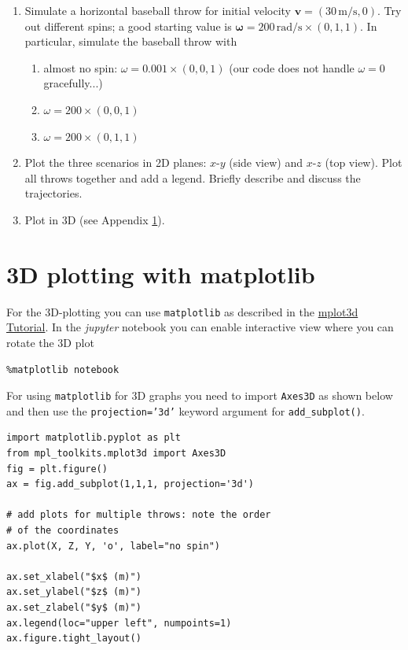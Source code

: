 \documentclass[letterpaper]{scrartcl}
\newenvironment{enuma}{\begin{enumerate}[label=(\alph*)]}{\end{enumerate}}
\newenvironment{enumi}{\begin{enumerate}[label=(\roman*)]}{\end{enumerate}}
\renewcommand{\vec}[1]{\ensuremath{\mathbf{#1}}}
\begin{document}
\begin{enuma}
\item Simulate a horizontal baseball throw for initial velocity
  $\vec{v} = (30\,\text{m/s}, 0)$.  Try out different spins; a good
  starting value is
  $\boldsymbol{\omega} = 200\,\text{rad/s} \times (0, 1, 1)$. In
  particular, simulate the baseball throw with
  \begin{enumi}
  \item almost no spin: $\omega = 0.001 \times (0, 0, 1)$ (our code
    does not handle $\omega = 0$ gracefully...)
  \item $\omega = 200 \times (0, 0, 1)$
  \item $\omega = 200 \times (0, 1, 1)$
  \end{enumi}
\item Plot the three scenarios in 2D planes: $x$-$y$ (side view) and
  $x$-$z$ (top view). Plot all throws together and add a
  legend. Briefly describe and discuss the trajectories.
\item Plot in 3D (see Appendix \ref{sec:mpl}).
\end{enuma}


\section{3D plotting with matplotlib}
\label{sec:mpl}

For the 3D-plotting you can use \texttt{matplotlib} as described in
the
\href{http://matplotlib.org/mpl_toolkits/mplot3d/tutorial.html}{mplot3d
  Tutorial}. In the \emph{jupyter} notebook you can enable
interactive view where you can rotate the 3D plot
\begin{verbatim}
%matplotlib notebook
\end{verbatim}
For using \texttt{matplotlib} for 3D graphs you need to import
\texttt{Axes3D} as shown below and then use the
\texttt{projection='3d'} keyword argument for \texttt{add\_subplot()}.
\begin{verbatim}
import matplotlib.pyplot as plt
from mpl_toolkits.mplot3d import Axes3D
fig = plt.figure()
ax = fig.add_subplot(1,1,1, projection='3d')

# add plots for multiple throws: note the order
# of the coordinates
ax.plot(X, Z, Y, 'o', label="no spin")

ax.set_xlabel("$x$ (m)")
ax.set_ylabel("$z$ (m)")
ax.set_zlabel("$y$ (m)")
ax.legend(loc="upper left", numpoints=1)
ax.figure.tight_layout()
\end{verbatim}


\end{document}
